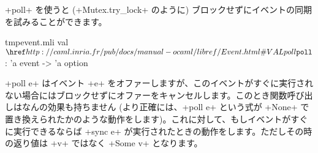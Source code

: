 \ml+poll+ を使うと (\ml+Mutex.try_lock+ のように) ブロックせずにイベントの同期を試みることができます。
%
\begin{listingcodefile}{tmpevent.mli}
val $\indexlibvalue{Event}{poll}$ : 'a event -> 'a option
\end{listingcodefile}
%
\ml+poll e+ はイベント \ml+e+ をオファーしますが、このイベントがすぐに実行されない場合にはブロックせずにオファーをキャンセルします。このとき関数呼び出しはなんの効果も持ちません (より正確には、\ml+poll e+ という式が \ml+None+ で置き換えられたかのような動作をします)。これに対して、もしイベントがすぐに実行できるならば \ml+sync e+ が実行されたときの動作をします。ただしその時の返り値は \ml+v+ ではなく \ml+Some v+ となります。

